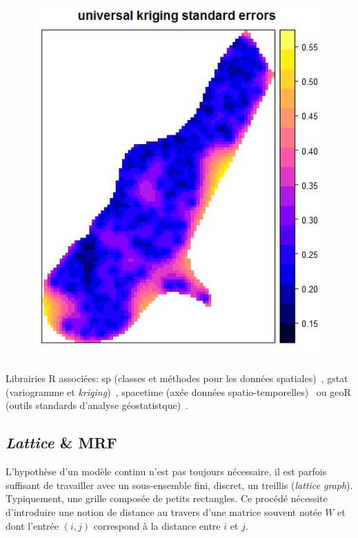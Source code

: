 \begin{figure}[!htb]
\endminipage\hfill
{}%
  \includegraphics[width=\linewidth]{EtatDeLArt/Kriging/UniversalErrors.png}
\endminipage
\end{figure}

Librairies R associées: sp (classes et méthodes pour les données spatiales)~\cite{sppackage}, gstat (variogramme et \textit{kriging})~\cite{pebesma2004multivariable}, spacetime (axée données spatio-temporelles)~\cite{pebesma2012spacetime} ou geoR (outils standards d'analyse géostatistque)~\cite{geoRpackage}.

\subsection{\textit{Lattice} \& MRF}\label{Variation_discrete}

L'hypothèse d'un modèle continu n'est pas toujours nécessaire, il est parfois suffisant de travailler avec un sous-ensemble fini, discret, un treillis (\textit{lattice graph}). Typiquement, une grille composée de petits rectangles. Ce procédé nécessite d'introduire une notion de distance au travers d'une matrice souvent notée $W$ et dont l'entrée $(i, j)$ correspond à la distance entre $i$ et $j$.

